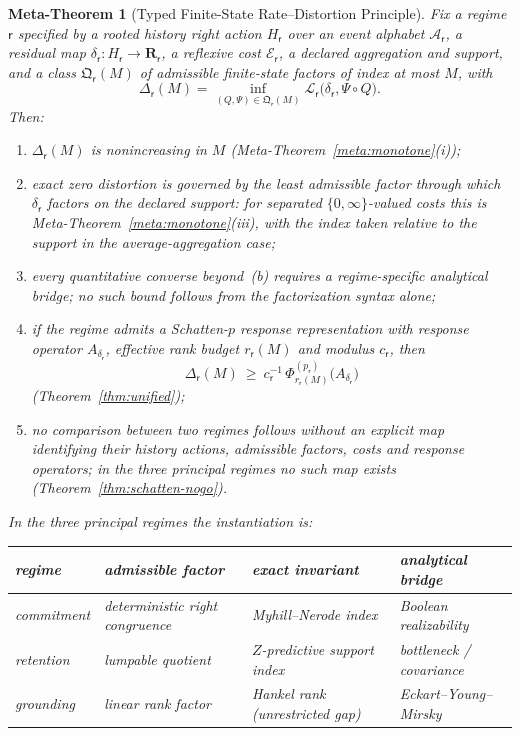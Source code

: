\documentclass[12pt]{article}
\newtheorem{metatheorem}[theorem]{Meta-Theorem}
\theoremstyle{definition}
\begin{document}
\begin{metatheorem}[Typed Finite-State Rate--Distortion Principle]
\label{meta:typed-rate-distortion}
Fix a regime $\mathsf r$ specified by a rooted history right action
$H_{\mathsf r}$ over an event alphabet $\mathcal A_{\mathsf r}$, a residual map
$\delta_{\mathsf r}:H_{\mathsf r}\to\mathbf R_{\mathsf r}$, a reflexive cost
$\mathcal E_{\mathsf r}$, a declared aggregation and support, and a class
$\mathfrak Q_{\mathsf r}(M)$ of admissible finite-state factors of index at
most $M$, with
\[
\Delta_{\mathsf r}(M)
=
\inf_{(Q,\Psi)\in\mathfrak Q_{\mathsf r}(M)}
\mathcal L_{\mathsf r}\bigl(\delta_{\mathsf r},\Psi\circ Q\bigr).
\]
Then:
\begin{enumerate}[label=(\alph*)]
\item $\Delta_{\mathsf r}(M)$ is nonincreasing in $M$
(Meta-Theorem~\ref{meta:monotone}(i));
\item exact zero distortion is governed by the least admissible factor
through which $\delta_{\mathsf r}$ factors on the declared support: for
separated $\{0,\infty\}$-valued costs this is
Meta-Theorem~\ref{meta:monotone}(iii), with the index taken relative to the
support in the average-aggregation case;
\item every quantitative converse beyond~(b) requires a regime-specific
analytical bridge; no such bound follows from the factorization syntax alone;
\item if the regime admits a Schatten-$p$ response representation with
response operator $A_{\delta_{\mathsf r}}$, effective rank budget
$r_{\mathsf r}(M)$ and modulus $c_{\mathsf r}$, then
\[
\Delta_{\mathsf r}(M)
\ \ge\
c_{\mathsf r}^{-1}\,
\Phi^{(p_{\mathsf r})}_{r_{\mathsf r}(M)}\bigl(A_{\delta_{\mathsf r}}\bigr)
\]
(Theorem~\ref{thm:unified});
\item no comparison between two regimes follows without an explicit map
identifying their history actions, admissible factors, costs and response
operators; in the three principal regimes no such map exists
(Theorem~\ref{thm:schatten-nogo}).
\end{enumerate}

In the three principal regimes the instantiation is:

\begin{center}
\small
\setlength{\tabcolsep}{4pt}
\begin{tabular}{@{}l>{\raggedright\arraybackslash}p{10.5em}>{\raggedright\arraybackslash}p{10em}l@{}}
\toprule
regime & admissible factor & exact invariant & analytical bridge \\
\midrule
commitment &
deterministic right congruence &
Myhill--Nerode index &
Boolean realizability \\
retention &
lumpable quotient &
$Z$-predictive support index &
bottleneck / covariance \\
grounding &
linear rank factor &
Hankel rank (unrestricted gap) &
Eckart--Young--Mirsky \\
\bottomrule
\end{tabular}
\end{center}


\end{metatheorem}
\end{document}
